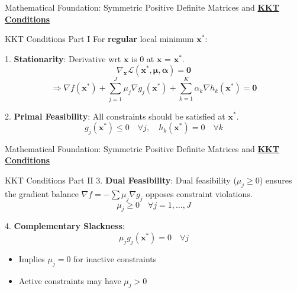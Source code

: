 \documentclass{beamer}
\begin{document}
\begin{frame}{{Mathematical Foundation: Symmetric Positive Definite Matrices and \textbf{\underline{KKT Conditions}}}}
    \begin{block}{KKT Conditions Part I}
        For \textbf{regular} local minimum $\bm{x}^*$:

        1. \textbf{Stationarity}:
        Derivative wrt $\bm{x}$ is 0 at $\bm{x}$ = $\bm{x}^*$.
        \[
            \nabla_{\bm{x}} \mathcal{L}(\bm{x}^*, \bm{\mu}, \bm{\alpha}) = \bm{0}
        \]
        \[
            \Rightarrow \nabla f(\bm{x}^*) + \sum_{j=1}^J \mu_j \nabla g_j(\bm{x}^*) + \sum_{k=1}^K \alpha_k \nabla h_k(\bm{x}^*) = \bm{0}
        \]

        2. \textbf{Primal Feasibility}:
        All constraints should be satisfied at $\bm{x^*}$.
        \[
            g_j(\bm{x}^*) \leq 0 \quad \forall j, \quad h_k(\bm{x}^*) = 0 \quad \forall k
        \]
    \end{block}
\end{frame}

\begin{frame}{{Mathematical Foundation: Symmetric Positive Definite Matrices and \textbf{\underline{KKT Conditions}}}}
    \begin{block}{KKT Conditions Part II}
        3. \textbf{Dual Feasibility}: 
        Dual feasibility ($\mu_j \geq 0$) ensures the gradient balance $\nabla f = -\sum \mu_j \nabla g_j$ opposes constraint violations.
        \[
            \mu_j \geq 0 \quad \forall j = 1,\ldots,J
        \]

        4. \textbf{Complementary Slackness}:
        \[
            \mu_j g_j(\bm{x}^*) = 0 \quad \forall j
        \]
        \begin{itemize}
            \item Implies $\mu_j = 0$ for inactive constraints
            \item Active constraints may have $\mu_j > 0$
        \end{itemize}
    \end{block}
\end{frame}
\end{document}
